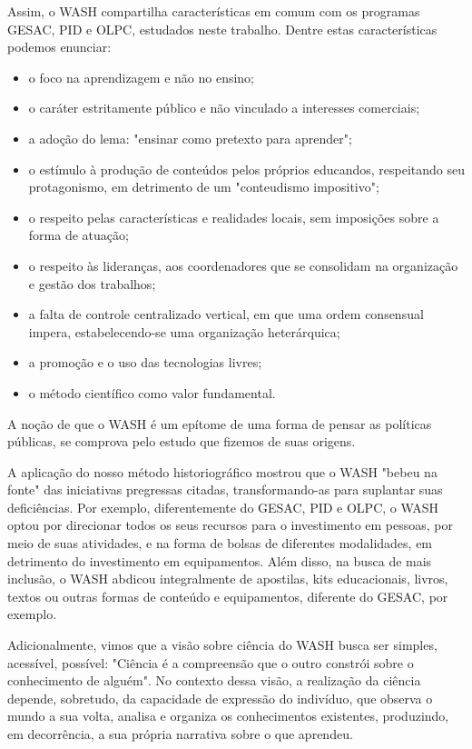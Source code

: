 Assim,  o WASH compartilha características em comum com os programas GESAC, PID e OLPC, estudados neste trabalho. Dentre estas características podemos enunciar:


\begin{itemize}
\item o foco na aprendizagem e não no ensino;
\item o caráter estritamente público e não vinculado a interesses comerciais;
\item a adoção do lema: "ensinar como pretexto para aprender";
\item o estímulo à produção de conteúdos pelos próprios educandos, respeitando seu protagonismo, em detrimento de um "conteudismo impositivo";
\item o respeito pelas características e realidades locais, sem imposições sobre a forma de atuação;
\item o respeito às lideranças, aos coordenadores que se consolidam na organização e gestão dos trabalhos;
\item a falta de controle centralizado vertical, em que uma ordem consensual impera, estabelecendo-se uma organização heterárquica;
\item a promoção e o uso das tecnologias livres;
\item o método científico como valor fundamental.
\end{itemize}

A noção de que o WASH é um epítome de uma forma de pensar as políticas públicas, se comprova pelo estudo que fizemos de suas origens.

A aplicação do nosso método historiográfico mostrou que o WASH "bebeu na fonte" das iniciativas pregressas citadas, transformando-as para suplantar suas deficiências.  Por exemplo, diferentemente do GESAC, PID e OLPC, o WASH optou por direcionar todos os seus recursos para o investimento em pessoas, por meio de suas atividades, e na forma de bolsas de diferentes modalidades, em detrimento do investimento em equipamentos. Além disso, na busca de mais inclusão, o WASH abdicou integralmente de apostilas, kits educacionais, livros, textos ou outras formas de conteúdo e equipamentos, diferente do GESAC, por exemplo.

Adicionalmente, vimos que a visão sobre ciência do WASH busca ser  simples, acessível, possível: "Ciência é a compreensão que o outro constrói sobre o conhecimento de alguém". No contexto dessa visão, a realização da ciência depende, sobretudo, da capacidade de expressão do indivíduo, que observa o mundo a sua volta, analisa e organiza os conhecimentos existentes, produzindo, em decorrência, a sua própria narrativa sobre o que aprendeu.


